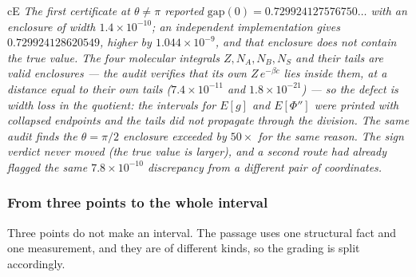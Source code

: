 \begin{claimbox}{cE}
\emph{The first certificate at $\theta\neq\pi$ reported $\mathrm{gap}(0)=0.729924127576750\ldots$
with an enclosure of width $1.4\times10^{-10}$; an independent implementation gives
$0.729924128620549$, higher by $1.044\times10^{-9}$, and that enclosure does \emph{not} contain the
true value. The four molecular integrals $Z,N_{A},N_{B},N_{S}$ and their tails \emph{are} valid
enclosures --- the audit verifies that its own $Z\,e^{-\beta c}$ lies inside them, at a distance
equal to their own tails ($7.4\times10^{-11}$ and $1.8\times10^{-21}$) --- so the defect is width loss
in the quotient: the intervals for $E[g]$ and $E[\Phi'']$ were printed with collapsed endpoints and
the tails did not propagate through the division. The same audit finds the $\theta=\pi/2$ enclosure
exceeded by $50\times$ for the same reason. The sign verdict never moved (the true value is
\emph{larger}), and a second route had already flagged the same $7.8\times10^{-10}$ discrepancy from a
different pair of coordinates.} \LE{}
\end{claimbox}


\subsubsection*{From three points to the whole interval}

Three points do not make an interval. The passage uses one structural fact and one measurement, and
they are of different kinds, so the grading is split accordingly.

